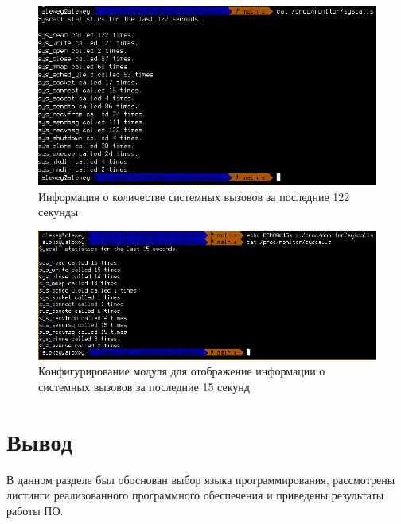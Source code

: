 \begin{figure}[h!]
	\begin{center}
		\includegraphics[scale=0.6]{img/syscalls_example_01.png}
	\end{center}
	\captionsetup{justification=centering}
	\caption{Информация о количестве системных вызовов за последние 122 секунды}
	\label{img:syscalls_example_01}
\end{figure}

\begin{figure}[h!]
	\begin{center}
		\includegraphics[scale=0.55]{img/syscalls_example_02.png}
	\end{center}
	\captionsetup{justification=centering}
	\caption{Конфигурирование модуля для отображение информации о системных вызовов за последние 15 секунд}
	\label{img:syscalls_example_02}
\end{figure}

\section*{Вывод}

В данном разделе был обоснован выбор языка программирования, рассмотрены листинги реализованного программного обеспечения и приведены результаты работы ПО.